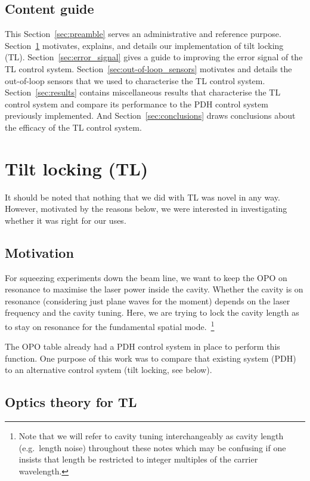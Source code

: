 \documentclass[aps,pra,superscriptaddress,reprint,nofootinbib]{revtex4-1}
\begin{document}
\subsection{Content guide}

This Section~\ref{sec:preamble} serves an administrative and reference purpose.
Section~\ref{sec:TL} motivates, explains, and details our implementation of tilt locking (TL).
Section~\ref{sec:error_signal} gives a guide to improving the error signal of the TL control system.
Section~\ref{sec:out-of-loop_sensors} motivates and details the out-of-loop sensors that we used to characterise the TL control system.
Section~\ref{sec:results} contains miscellaneous results that characterise the TL control system and compare its performance to the PDH control system previously implemented.
And Section~\ref{sec:conclusions} draws conclusions about the efficacy of the TL control system.


\section{Tilt locking (TL)}
\label{sec:TL}

It should be noted that nothing that we did with TL was novel in any way. However, motivated by the reasons below, we were interested in investigating whether it was right for our uses.

\subsection{Motivation}

For squeezing experiments down the beam line, we want to keep the OPO on resonance to maximise the laser power inside the cavity. Whether the cavity is on resonance (considering just plane waves for the moment) depends on the laser frequency and the cavity tuning. Here, we are trying to lock the cavity length as to stay on resonance for the fundamental spatial mode.~\footnote{Note that we will refer to cavity tuning interchangeably as cavity length (e.g.\ length noise) throughout these notes which may be confusing if one insists that length be restricted to integer multiples of the carrier wavelength.}


The OPO table already had a PDH control system in place to perform this function. One purpose of this work was to compare that existing system (PDH) to an alternative control system (tilt locking, see below). 


\subsection{Optics theory for TL}
\end{document}
